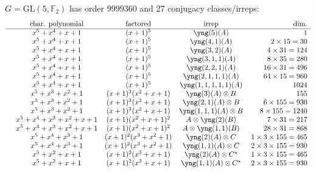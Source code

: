 \documentclass[11pt,oneside]{article}
\newcommand{\GL}{\mathrm{GL}}
\newcommand{\Field}{\mathbb{F}}
\newcommand{\hsp}{\ \ \ \ }
\newcommand{\tensor}{\otimes}
\begin{document}
$G=\GL(5,\Field_2)$ has order 9999360 and 27 conjugacy classes/irreps:
$$
\begin{array}{ccccr}
    &             \text{char. polynomial}  &  \text{factored} & \text{irrep} & \text{dim.}  \\
\hline
    &               x^5+x^4+x+1 &                 (x+1)^5 & \yng(5)(A)                   &  1  \\
    &               x^5+x^4+x+1 &                 (x+1)^5 & \yng(4,1)(A)                 &  2\times 15=30  \\
    &               x^5+x^4+x+1 &                 (x+1)^5 & \yng(3,2)(A)                 &  4\times 31=124  \\
    &               x^5+x^4+x+1 &                 (x+1)^5 & \yng(3,1,1)(A)               &  8\times 35=280  \\
    &               x^5+x^4+x+1 &                 (x+1)^5 & \yng(2,2,1)(A)               &  16\times 31=496  \\
    &               x^5+x^4+x+1 &                 (x+1)^5 & \yng(2,1,1,1)(A)             &  64\times 15=960  \\
    &               x^5+x^4+x+1 &                 (x+1)^5 & \yng(1,1,1,1,1)(A)           &  1024  \\
    &             x^5+x^3+x^2+1 &       (x+1)^3(x^2+x+1)  & \yng(3)(A)\tensor B      &  155   \\
    &             x^5+x^3+x^2+1 &       (x+1)^3(x^2+x+1)  & \yng(2,1)(A)\tensor B        &  6\times 155=930   \\
    &             x^5+x^3+x^2+1 &       (x+1)^3(x^2+x+1)  & \yng(1,1,1)(A)\tensor B          &  \hsp 8\times 155=1240   \\
    &       x^5+x^4+x^3+x^2+x+1 &       (x+1)(x^2+x+1)^2  & A\tensor\yng(2)(B)         &  7 \times 31 = 217  \\
    &       x^5+x^4+x^3+x^2+x+1 &       (x+1)(x^2+x+1)^2  & A\tensor \yng(1,1)(B)          &  28 \times 31 = 868  \\
    &             x^5+x^4+x^3+1 &     (x+1)^2(x^3+x^2+1)  & \yng(2)(A)\tensor C        &  1 \times 3 \times 155=465   \\
    &             x^5+x^4+x^3+1 &     (x+1)^2(x^3+x^2+1)  & \yng(1,1)(A)\tensor C          &  2 \times 3 \times 155=930  \\
    &               x^5+x^2+x+1 &       (x+1)^2(x^3+x+1)  & \yng(2)(A)\tensor C^{\star}&  1 \times 3 \times 155=465   \\
    &               x^5+x^2+x+1 &       (x+1)^2(x^3+x+1)  & \yng(1,1)(A)\tensor C^{\star}  &  2 \times 3 \times 155=930   \\

\end{array}$$
\end{document}
